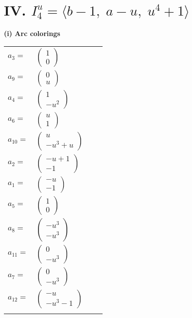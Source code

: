 \documentclass[1p]{elsarticle_modified}
\theoremstyle{definition}
\begin{document}
\centering \section*{IV. $I^u_{4}= \langle b-1,\;a- u,\;u^4+1 \rangle$}
\flushleft \textbf{(i) Arc colorings}\\
\begin{tabular}{m{7pt} m{180pt} m{7pt} m{180pt} }
\flushright $a_{3}=$&$\begin{pmatrix}1\\0\end{pmatrix}$ \\
\flushright $a_{9}=$&$\begin{pmatrix}0\\u\end{pmatrix}$ \\
\flushright $a_{4}=$&$\begin{pmatrix}1\\- u^2\end{pmatrix}$ \\
\flushright $a_{6}=$&$\begin{pmatrix}u\\1\end{pmatrix}$ \\
\flushright $a_{10}=$&$\begin{pmatrix}u\\- u^3+u\end{pmatrix}$ \\
\flushright $a_{2}=$&$\begin{pmatrix}- u+1\\-1\end{pmatrix}$ \\
\flushright $a_{1}=$&$\begin{pmatrix}- u\\-1\end{pmatrix}$ \\
\flushright $a_{5}=$&$\begin{pmatrix}1\\0\end{pmatrix}$ \\
\flushright $a_{8}=$&$\begin{pmatrix}- u^3\\- u^3\end{pmatrix}$ \\
\flushright $a_{11}=$&$\begin{pmatrix}0\\- u^3\end{pmatrix}$ \\
\flushright $a_{7}=$&$\begin{pmatrix}0\\- u^3\end{pmatrix}$ \\
\flushright $a_{12}=$&$\begin{pmatrix}- u\\- u^3-1\end{pmatrix}$\\&\end{tabular}
\end{document}
